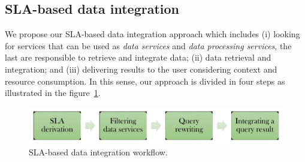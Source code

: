 \subsection{SLA-based data integration}
We propose our SLA-based data integration approach which includes (i) looking for services that can be used as \textit{data services} and \textit{data processing services}, the last are responsible to retrieve and integrate data; (ii) data retrieval and integration; and (iii) delivering results to the user considering context and resource consumption.  In this sense, our approach is divided in four steps as illustrated in the figure~\ref{fig:generalapproach}. 
\begin{figure}[h!]
\centering
\includegraphics[scale=0.33]{workflow-approach.pdf}
\caption{SLA-based data integration workflow.}
\label{fig:generalapproach}
\end{figure}

